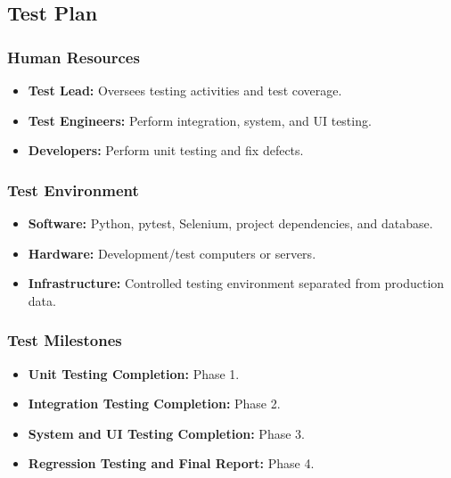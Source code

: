 \subsection{Test Plan}
\label{subsec:test-plan}

\subsubsection{Human Resources}
\label{subsubsec:test-human-resources}

\begin{itemize}[leftmargin=1.5em, nosep]
    \item \textbf{Test Lead:} Oversees testing activities and test coverage.
    \item \textbf{Test Engineers:} Perform integration, system, and UI testing.
    \item \textbf{Developers:} Perform unit testing and fix defects.
\end{itemize}

\subsubsection{Test Environment}
\label{subsubsec:test-environment}

\begin{itemize}[leftmargin=1.5em, nosep]
    \item \textbf{Software:} Python, pytest, Selenium, project dependencies, and database.
    \item \textbf{Hardware:} Development/test computers or servers.
    \item \textbf{Infrastructure:} Controlled testing environment separated from production data.
\end{itemize}

\subsubsection{Test Milestones}
\label{subsubsec:test-milestones}

\begin{itemize}[leftmargin=1.5em, nosep]
    \item \textbf{Unit Testing Completion:} Phase 1.
    \item \textbf{Integration Testing Completion:} Phase 2.
    \item \textbf{System and UI Testing Completion:} Phase 3.
    \item \textbf{Regression Testing and Final Report:} Phase 4.
\end{itemize}

